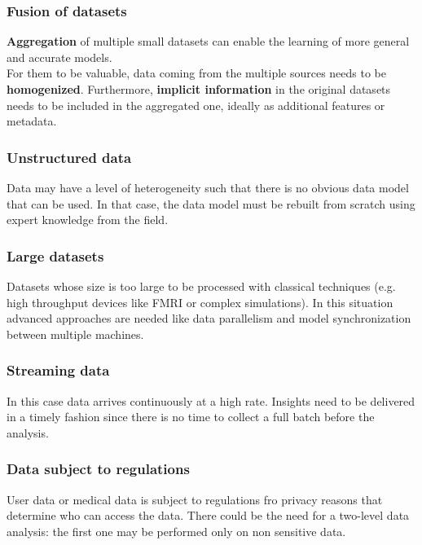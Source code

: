 \subsubsection{Fusion of datasets}
\textbf{Aggregation} of multiple small datasets can enable the learning of more general and accurate models.\\
For them to be valuable, data coming from the multiple sources needs to be \textbf{homogenized}. Furthermore, \textbf{implicit information} in the original datasets needs to be included in the aggregated one, ideally as additional features or metadata.

\subsubsection{Unstructured data}
Data may have a level of heterogeneity such that there is no obvious data model that can be used. In that case, the data model must be rebuilt from scratch using expert knowledge from the field.

\subsubsection{Large datasets}
Datasets whose size is too large to be processed with classical techniques (e.g. high throughput devices like FMRI or complex simulations). In this situation advanced approaches are needed like data parallelism and model synchronization between multiple machines.

\subsubsection{Streaming data}
In this case data arrives continuously at a high rate. Insights need to be delivered in a timely fashion since there is no time to collect a full batch before the analysis.

\subsubsection{Data subject to regulations}
User data or medical data is subject to regulations fro privacy reasons that determine who can access the data. There could be the need for a two-level data analysis: the first one may be performed only on non sensitive data.

